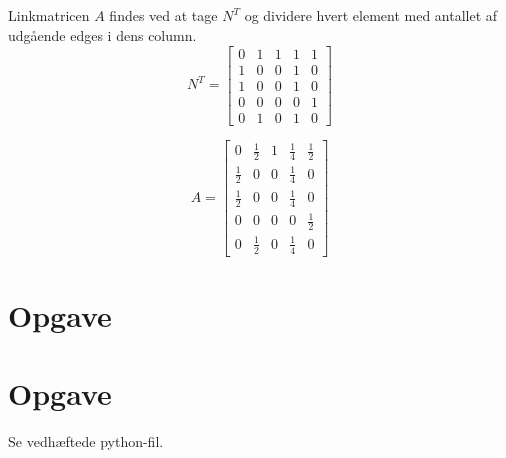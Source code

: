 \documentclass[a4paper,12pt]{article}
\begin{document}
\subsection{}
Linkmatricen $A$ findes ved at tage $N^T$ og dividere hvert element med antallet af udgående edges i dens column.\\
\[
N^T =
\left[\begin{array}{ccccc}
    0 & 1 & 1 & 1 & 1 \\
    1 & 0 & 0 & 1 & 0 \\
    1 & 0 & 0 & 1 & 0 \\
    0 & 0 & 0 & 0 & 1 \\
    0 & 1 & 0 & 1 & 0
\end{array}\right]
\]


\[
A =
\left[\begin{array}{ccccc}
    0 & \frac{1}{2} & 1 & \frac{1}{4} & \frac{1}{2} \\
    \frac{1}{2} & 0 & 0 & \frac{1}{4} & 0 \\
    \frac{1}{2} & 0 & 0 & \frac{1}{4} & 0 \\
    0 & 0 & 0 & 0 & \frac{1}{2} \\
    0 & \frac{1}{2} & 0 & \frac{1}{4} & 0
\end{array}\right]
\]

\subsection{}


\section[Opgave]{Opgave}
\subsection{}


\subsection{}


\subsection{}


\section[Opgave]{Opgave}
Se vedhæftede python-fil.
\end{document}

